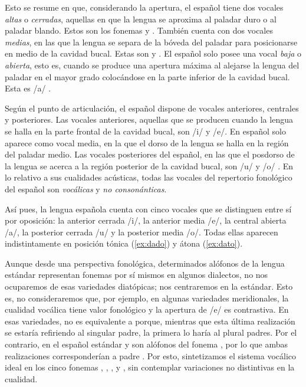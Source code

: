 Esto se resume en  que, considerando la apertura, el español tiene dos vocales \textit{altas} o \textit{cerradas}, aquellas en que la lengua se aproxima al paladar duro o al paladar blando. Estos son los fonemas  y . También cuenta con dos vocales \textit{medias}, en las que la lengua se separa de la bóveda del paladar para posicionarse en medio de la cavidad bucal. Estas son  y . El español solo posee una vocal \textit{baja} o \textit{abierta}, esto es, cuando se produce una apertura máxima al alejarse la lengua del paladar en el mayor grado colocándose en la parte inferior de la cavidad bucal. Esta es /a/ \parencite[146-147]{quilis2019}.

Según el punto  de articulación, el español dispone de vocales anteriores, centrales y posteriores. Las vocales anteriores, aquellas que se producen cuando la lengua se halla en la parte frontal de la cavidad bucal, son /i/ y /e/. En español solo aparece  como vocal media, en la que el dorso de la lengua se halla en la región del paladar medio. Las vocales posteriores del español, en las que el posdorso de la lengua se acerca a la región posterior de la cavidad bucal, son /u/ y /o/ \parencite[147-148]{quilis2019}. En lo relativo a sus cualidades acústicas, todas las vocales del repertorio fonológico del español son \textit{vocálicas} y \textit{no consonánticas}.



Así pues, la lengua española cuenta con cinco vocales que se distinguen entre sí por oposición: la anterior cerrada /i/, la anterior media /e/, la central abierta /a/, la posterior cerrada /u/ y la posterior media /o/. Todas ellas aparecen indistintamente en posición tónica (\ref{ex:dado}) y átona (\ref{ex:dato}).



Aunque desde una perspectiva fonológica, determinados alófonos de la lengua estándar representan fonemas por sí mismos en algunos dialectos, no nos ocuparemos de esas variedades diatópicas; nos centraremos en la estándar. Esto es, no consideraremos que, por ejemplo, en algunas variedades meridionales, la cualidad vocálica tiene valor fonológico y la apertura de /e/ es contrastiva. En esas variedades, \ipa{[ˈpaðɾɛ]} no es equivalente a \ipa{[ˈpaðɾe]} porque, mientras que esta última realización se estaría refiriendo al singular \textlangle{}padre\textrangle{}, la primera lo haría al plural \textlangle{}padres\textrangle{}. Por el contrario, en el español estándar \ipa{[ɛ]} y \ipa{[e]} son alófonos del fonema , por lo que ambas realizaciones corresponderían a \textlangle{}padre\textrangle{} \parencites[148-150]{alarcos1964}[173-176]{quilis2019}. Por esto, sintetizamos el sistema vocálico ideal en los cinco fonemas , , ,  y , sin contemplar variaciones no distintivas en la cualidad.

